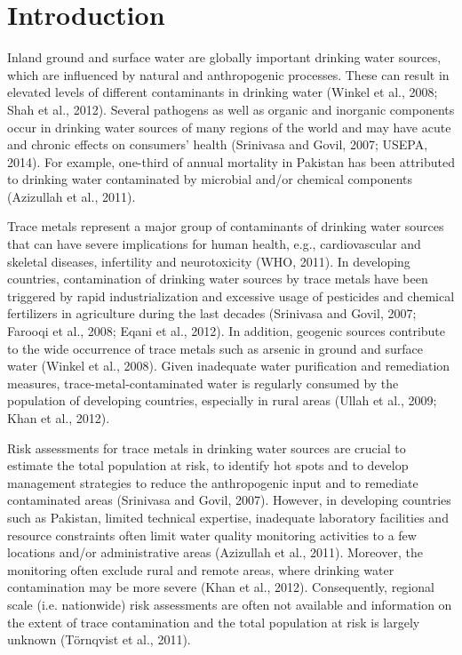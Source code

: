 \newpage

\section{Introduction}
\label{Introduction}

Inland ground and surface water are globally important drinking water sources, which are influenced by natural and anthropogenic processes. These can result in elevated levels of different contaminants in drinking water (Winkel et al., 2008; Shah et al., 2012). Several pathogens as well as organic and inorganic components occur in drinking water sources of many regions of the world and may have acute and chronic effects on consumers' health (Srinivasa and Govil, 2007; USEPA, 2014). For example, one-third of annual mortality in Pakistan has been attributed to drinking water contaminated by microbial and/or chemical components (Azizullah et al., 2011).

Trace metals represent a major group of contaminants of drinking water sources that can have severe implications for human health, e.g., cardiovascular and skeletal diseases, infertility and neurotoxicity (WHO, 2011). In developing countries, contamination of drinking water sources by trace metals have been triggered by rapid industrialization and excessive usage of pesticides and chemical fertilizers in agriculture during the last decades (Srinivasa and Govil, 2007; Farooqi et al., 2008;  Eqani et al., 2012). In addition, geogenic sources contribute to the wide occurrence of trace metals such as arsenic in ground and surface water (Winkel et al., 2008). Given inadequate water purification and remediation measures, trace-metal-contaminated water is regularly consumed by the population of developing countries, especially in rural areas (Ullah et al., 2009; Khan et al., 2012).

Risk assessments for trace metals in drinking water sources are crucial to estimate the total population at risk, to identify hot spots and to develop management strategies to reduce the anthropogenic input and to remediate contaminated areas (Srinivasa and Govil, 2007). However, in developing countries such as Pakistan, limited technical expertise, inadequate laboratory facilities and resource constraints often limit water quality monitoring activities to a few locations and/or administrative areas (Azizullah et al., 2011). Moreover, the monitoring often exclude rural and remote areas, where drinking water contamination may be more severe (Khan et al., 2012). Consequently, regional scale (i.e. nationwide) risk assessments are often not available and information on the extent of trace contamination and the total population at risk is largely unknown (Törnqvist et al., 2011).

